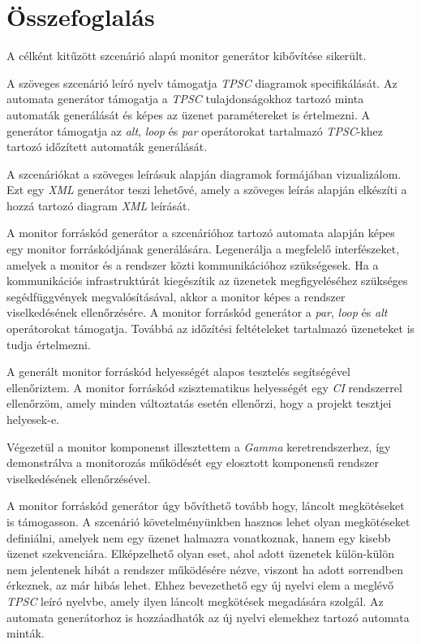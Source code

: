 \chapter{Összefoglalás}

A célként kitűzött szcenárió alapú monitor generátor kibővítése sikerült.

A szöveges szcenárió leíró nyelv támogatja \textit{TPSC} diagramok specifikálását.
Az automata generátor támogatja a \textit{TPSC} tulajdonságokhoz tartozó minta automaták generálását és képes az üzenet paramétereket is értelmezni.
A generátor támogatja az \textit{alt}, \textit{loop} és \textit{par} operátorokat tartalmazó \textit{TPSC}-khez tartozó időzített automaták generálását.

A szcenáriókat a szöveges leírásuk alapján diagramok formájában vizualizálom.
Ezt egy \textit{XML} generátor teszi lehetővé, amely a szöveges leírás alapján elkészíti a hozzá tartozó diagram \textit{XML} leírását.

A monitor forráskód generátor a szcenárióhoz tartozó automata alapján képes egy monitor forráskódjának generálására.
Legenerálja a megfelelő interfészeket, amelyek a monitor és a rendszer közti kommunikációhoz szükségesek.
Ha a kommunikációs infrastruktúrát kiegészítik az üzenetek megfigyeléséhez szükséges segédfüggvények megvalósításával, akkor a monitor képes a rendszer viselkedésének ellenőrzésére.
A monitor forráskód generátor a \textit{par}, \textit{loop} és \textit{alt} operátorokat támogatja.
Továbbá az időzítési feltételeket tartalmazó üzeneteket is tudja értelmezni.

A generált monitor forráskód helyességét alapos tesztelés segítségével ellenőriztem.
A monitor forráskód szisztematikus helyességét egy \textit{CI} rendszerrel ellenőrzöm, amely minden változtatás esetén ellenőrzi, hogy a projekt tesztjei helyesek-e.

Végezetül a monitor komponenst illesztettem a \textit{Gamma} keretrendszerhez, így demonstrálva a monitorozás működését egy elosztott komponensű rendszer viselkedésének ellenőrzésével.

A monitor forráskód generátor úgy bővíthető tovább hogy, láncolt megkötéseket is támogasson.
A szcenárió követelményünkben hasznos lehet olyan megkötéseket definiálni, amelyek nem egy üzenet halmazra vonatkoznak, hanem egy kisebb üzenet szekvenciára.
Elképzelhető olyan eset, ahol adott üzenetek külön-külön nem jelentenek hibát a rendszer működésére nézve, viszont ha adott sorrendben érkeznek, az már hibás lehet.
Ehhez bevezethető egy új nyelvi elem a meglévő \textit{TPSC} leíró nyelvbe, amely ilyen láncolt megkötések megadására szolgál.
Az automata generátorhoz is hozzáadhatók az új nyelvi elemekhez tartozó automata minták.